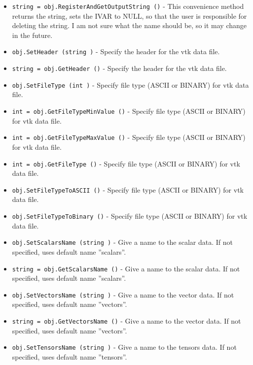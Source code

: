 \begin{itemize}
\item  \verb|string = obj.RegisterAndGetOutputString ()| -  This convenience method returns the string, sets the IVAR to NULL,
 so that the user is responsible for deleting the string.
 I am not sure what the name should be, so it may change in the future.

\item  \verb|obj.SetHeader (string )| -  Specify the header for the vtk data file.

\item  \verb|string = obj.GetHeader ()| -  Specify the header for the vtk data file.

\item  \verb|obj.SetFileType (int )| -  Specify file type (ASCII or BINARY) for vtk data file.

\item  \verb|int = obj.GetFileTypeMinValue ()| -  Specify file type (ASCII or BINARY) for vtk data file.

\item  \verb|int = obj.GetFileTypeMaxValue ()| -  Specify file type (ASCII or BINARY) for vtk data file.

\item  \verb|int = obj.GetFileType ()| -  Specify file type (ASCII or BINARY) for vtk data file.

\item  \verb|obj.SetFileTypeToASCII ()| -  Specify file type (ASCII or BINARY) for vtk data file.

\item  \verb|obj.SetFileTypeToBinary ()| -  Specify file type (ASCII or BINARY) for vtk data file.

\item  \verb|obj.SetScalarsName (string )| -  Give a name to the scalar data. If not specified, uses default
 name ''scalars''.

\item  \verb|string = obj.GetScalarsName ()| -  Give a name to the scalar data. If not specified, uses default
 name ''scalars''.

\item  \verb|obj.SetVectorsName (string )| -  Give a name to the vector data. If not specified, uses default
 name ''vectors''.

\item  \verb|string = obj.GetVectorsName ()| -  Give a name to the vector data. If not specified, uses default
 name ''vectors''.

\item  \verb|obj.SetTensorsName (string )| -  Give a name to the tensors data. If not specified, uses default
 name ''tensors''.


\end{itemize}
